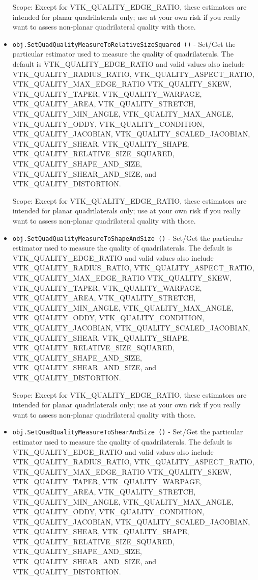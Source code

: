 \begin{itemize}
 Scope: Except for VTK\_QUALITY\_EDGE\_RATIO, these estimators are intended for planar
 quadrilaterals only; use at your own risk if you really want to assess non-planar
 quadrilateral quality with those.

\item  \verb|obj.SetQuadQualityMeasureToRelativeSizeSquared ()| -  Set/Get the particular estimator used to measure the quality of quadrilaterals.
 The default is VTK\_QUALITY\_EDGE\_RATIO and valid values also include
 VTK\_QUALITY\_RADIUS\_RATIO, VTK\_QUALITY\_ASPECT\_RATIO, VTK\_QUALITY\_MAX\_EDGE\_RATIO
 VTK\_QUALITY\_SKEW, VTK\_QUALITY\_TAPER, VTK\_QUALITY\_WARPAGE, VTK\_QUALITY\_AREA,
 VTK\_QUALITY\_STRETCH, VTK\_QUALITY\_MIN\_ANGLE, VTK\_QUALITY\_MAX\_ANGLE,
 VTK\_QUALITY\_ODDY, VTK\_QUALITY\_CONDITION, VTK\_QUALITY\_JACOBIAN,
 VTK\_QUALITY\_SCALED\_JACOBIAN, VTK\_QUALITY\_SHEAR, VTK\_QUALITY\_SHAPE,
 VTK\_QUALITY\_RELATIVE\_SIZE\_SQUARED, VTK\_QUALITY\_SHAPE\_AND\_SIZE,
 VTK\_QUALITY\_SHEAR\_AND\_SIZE, and VTK\_QUALITY\_DISTORTION.

 Scope: Except for VTK\_QUALITY\_EDGE\_RATIO, these estimators are intended for planar
 quadrilaterals only; use at your own risk if you really want to assess non-planar
 quadrilateral quality with those.

\item  \verb|obj.SetQuadQualityMeasureToShapeAndSize ()| -  Set/Get the particular estimator used to measure the quality of quadrilaterals.
 The default is VTK\_QUALITY\_EDGE\_RATIO and valid values also include
 VTK\_QUALITY\_RADIUS\_RATIO, VTK\_QUALITY\_ASPECT\_RATIO, VTK\_QUALITY\_MAX\_EDGE\_RATIO
 VTK\_QUALITY\_SKEW, VTK\_QUALITY\_TAPER, VTK\_QUALITY\_WARPAGE, VTK\_QUALITY\_AREA,
 VTK\_QUALITY\_STRETCH, VTK\_QUALITY\_MIN\_ANGLE, VTK\_QUALITY\_MAX\_ANGLE,
 VTK\_QUALITY\_ODDY, VTK\_QUALITY\_CONDITION, VTK\_QUALITY\_JACOBIAN,
 VTK\_QUALITY\_SCALED\_JACOBIAN, VTK\_QUALITY\_SHEAR, VTK\_QUALITY\_SHAPE,
 VTK\_QUALITY\_RELATIVE\_SIZE\_SQUARED, VTK\_QUALITY\_SHAPE\_AND\_SIZE,
 VTK\_QUALITY\_SHEAR\_AND\_SIZE, and VTK\_QUALITY\_DISTORTION.

 Scope: Except for VTK\_QUALITY\_EDGE\_RATIO, these estimators are intended for planar
 quadrilaterals only; use at your own risk if you really want to assess non-planar
 quadrilateral quality with those.

\item  \verb|obj.SetQuadQualityMeasureToShearAndSize ()| -  Set/Get the particular estimator used to measure the quality of quadrilaterals.
 The default is VTK\_QUALITY\_EDGE\_RATIO and valid values also include
 VTK\_QUALITY\_RADIUS\_RATIO, VTK\_QUALITY\_ASPECT\_RATIO, VTK\_QUALITY\_MAX\_EDGE\_RATIO
 VTK\_QUALITY\_SKEW, VTK\_QUALITY\_TAPER, VTK\_QUALITY\_WARPAGE, VTK\_QUALITY\_AREA,
 VTK\_QUALITY\_STRETCH, VTK\_QUALITY\_MIN\_ANGLE, VTK\_QUALITY\_MAX\_ANGLE,
 VTK\_QUALITY\_ODDY, VTK\_QUALITY\_CONDITION, VTK\_QUALITY\_JACOBIAN,
 VTK\_QUALITY\_SCALED\_JACOBIAN, VTK\_QUALITY\_SHEAR, VTK\_QUALITY\_SHAPE,
 VTK\_QUALITY\_RELATIVE\_SIZE\_SQUARED, VTK\_QUALITY\_SHAPE\_AND\_SIZE,
 VTK\_QUALITY\_SHEAR\_AND\_SIZE, and VTK\_QUALITY\_DISTORTION.


\end{itemize}
